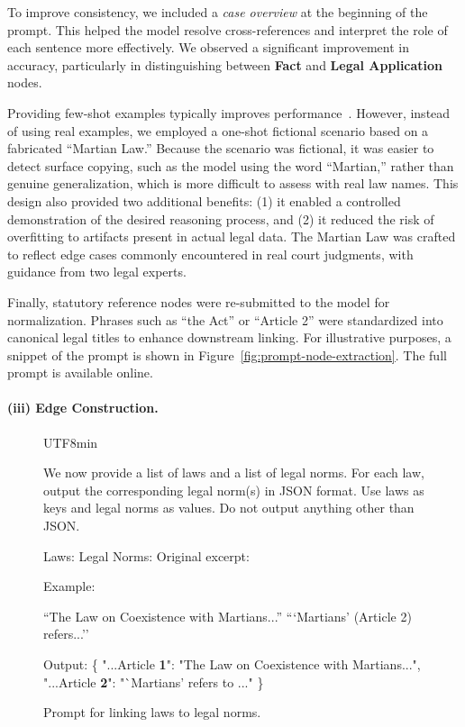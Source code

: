 \documentclass[11pt]{article}
\begin{document}
To improve consistency, we included a \textit{case overview} at the beginning of the prompt. This helped the model resolve cross-references and interpret the role of each sentence more effectively. We observed a significant improvement in accuracy, particularly in distinguishing between \textbf{Fact} and \textbf{Legal Application} nodes.



Providing few-shot examples typically improves performance~\cite{brown2020language}. However, instead of using real examples, we employed a one-shot fictional scenario based on a fabricated ``Martian Law.'' Because the scenario was fictional, it was easier to detect surface copying, such as the model using the word ``Martian,'' rather than genuine generalization, which is more difficult to assess with real law names. This design also provided two additional benefits: (1) it enabled a controlled demonstration of the desired reasoning process, and (2) it reduced the risk of overfitting to artifacts present in actual legal data. The Martian Law was crafted to reflect edge cases commonly encountered in real court judgments, with guidance from two legal experts.




Finally, statutory reference nodes were re-submitted to the model for normalization. Phrases such as ``the Act'' or ``Article 2'' were standardized into canonical legal titles to enhance downstream linking. For illustrative purposes, a snippet of the prompt is shown in Figure~\ref{fig:prompt-node-extraction}. The full prompt is available online.


\paragraph{\textbf{(iii) Edge Construction.}}

\begin{figure}[tb]
  \centering
  \begin{CJK}{UTF8}{min}
  \begin{tcolorbox}[enhanced, colback=white]
We now provide a list of laws and a list of legal norms.  
For each law, output the corresponding legal norm(s) in JSON format.  
Use laws as keys and legal norms as values.  
Do not output anything other than JSON.

Laws: %
Legal Norms: %
Original excerpt: %

Example:
 
``The Law on Coexistence with Martians...''  
```Martians’ (Article 2) refers...''

Output:  
\{
  "...Article \textbf{1}": "The Law on Coexistence with Martians...",  
  "...Article \textbf{2}": "`Martians' refers to ..."
\}
  \end{tcolorbox}
  \end{CJK}
  \caption{Prompt for linking laws to legal norms.}
  \label{fig:prompt-law-norm}
\end{figure}
\end{document}
